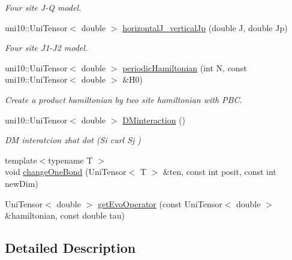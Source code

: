 \begin{DoxyCompactItemize}
\begin{DoxyCompactList}\small\item\em Four site J-\/Q model. \end{DoxyCompactList}\item 
uni10\+::\+Uni\+Tensor$<$ double $>$ \hyperlink{group__aux_gafe43f9cda4abd51592e3f02ced641d81}{horizontal\+J\+\_\+vertical\+Jp} (double J, double Jp)\hypertarget{group__aux_gafe43f9cda4abd51592e3f02ced641d81}{}\label{group__aux_gafe43f9cda4abd51592e3f02ced641d81}

\begin{DoxyCompactList}\small\item\em Four site J1-\/\+J2 model. \end{DoxyCompactList}\item 
uni10\+::\+Uni\+Tensor$<$ double $>$ \hyperlink{group__aux_ga60fdd51cf7a17b7428a323812dad1637}{periodic\+Hamiltonian} (int N, const uni10\+::\+Uni\+Tensor$<$ double $>$ \&H0)\hypertarget{group__aux_ga60fdd51cf7a17b7428a323812dad1637}{}\label{group__aux_ga60fdd51cf7a17b7428a323812dad1637}

\begin{DoxyCompactList}\small\item\em Create a product hamiltonian by two site hamiltonian with P\+BC. \end{DoxyCompactList}\item 
uni10\+::\+Uni\+Tensor$<$ double $>$ \hyperlink{group__aux_gadc015ea2a7bbc43a8e0fc8be1fdfcfd5}{D\+Minteraction} ()\hypertarget{group__aux_gadc015ea2a7bbc43a8e0fc8be1fdfcfd5}{}\label{group__aux_gadc015ea2a7bbc43a8e0fc8be1fdfcfd5}

\begin{DoxyCompactList}\small\item\em DM interatcion zhat dot (Si curl Sj ) \end{DoxyCompactList}\item 
{\footnotesize template$<$typename T $>$ }\\void \hyperlink{group__aux_gab89ab95575d2dbffe963736a7e570f70}{change\+One\+Bond} (Uni\+Tensor$<$ T $>$ \&ten, const int posit, const int new\+Dim)
\item 
Uni\+Tensor$<$ double $>$ \hyperlink{group__aux_ga0e4a0b7260bf31a6b0fdec947605771c}{get\+Evo\+Operator} (const Uni\+Tensor$<$ double $>$ \&hamiltonian, const double tau)
\end{DoxyCompactItemize}


\subsection{Detailed Description}


